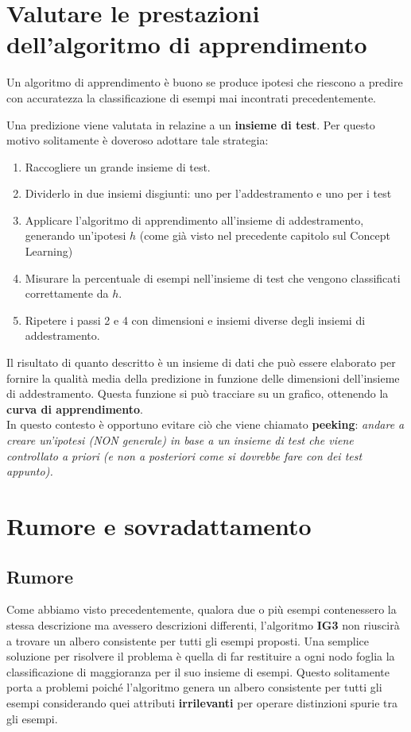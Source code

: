 \section{Valutare le prestazioni dell'algoritmo di apprendimento}
\begin{definizione}
  Un algoritmo di apprendimento è buono se produce ipotesi che riescono a predire con accuratezza la classificazione di esempi mai incontrati precedentemente.
\end{definizione}
Una predizione viene valutata in relazine a un \textbf{insieme di test}. Per questo motivo solitamente è doveroso adottare tale strategia:
\begin{enumerate}
    \item Raccogliere un grande insieme di test.
    \item Dividerlo in due insiemi disgiunti: uno per l'addestramento e uno per i test
    \item Applicare l'algoritmo di apprendimento all'insieme di addestramento, generando un'ipotesi $h$ (come già visto nel precedente capitolo sul Concept Learning)
    \item Misurare la percentuale di esempi nell'insieme di test che vengono classificati correttamente da $h$.
    \item Ripetere i passi 2 e 4 con dimensioni e insiemi diverse degli insiemi di addestramento.
\end{enumerate}
Il risultato di quanto descritto è un insieme di dati che può essere elaborato per fornire la qualità media della predizione in funzione delle dimensioni dell'insieme di addestramento. Questa funzione si può tracciare su un grafico, ottenendo la \textbf{curva di apprendimento}. \\ In questo contesto è opportuno evitare ciò che viene chiamato \textbf{peeking}: \textit{andare a creare un'ipotesi (NON generale) in base a un insieme di test che viene controllato a priori (e non a posteriori come si dovrebbe fare con dei test appunto).}
\section{Rumore e sovradattamento}
\subsection{Rumore}
Come abbiamo visto precedentemente, qualora due o più esempi contenessero la stessa descrizione ma avessero descrizioni differenti, l'algoritmo \textbf{IG3} non riuscirà a trovare un albero consistente per tutti gli esempi proposti. Una semplice soluzione per risolvere il problema è quella di far restituire a ogni nodo foglia la classificazione di maggioranza per il suo insieme di esempi. Questo solitamente porta a problemi poiché l'algoritmo genera un albero consistente per tutti gli esempi considerando quei attributi \textbf{irrilevanti} per operare distinzioni spurie tra gli esempi. 
